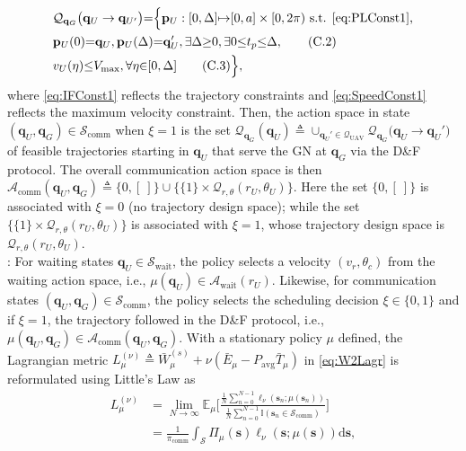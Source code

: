 \documentclass[10pt,twocolumn]{IEEEtran}
\begin{document}
\begin{align*}
	&\mathcal{Q}_{\mathbf{q}_{G}}\big({\mathbf{q}}_{U}\rightarrow{\mathbf{q}}_{U'}\big){=}\Big\{\mathbf{p}_{U}:[0,\Delta]{\mapsto}[0,a]\times[0,2\pi)\text{ s.t. \ref{eq:PLConst1},}\\
	&\mathbf{p}_{U}(0){=}{\mathbf{q}}_{U},\mathbf{p}_{U}(\Delta){=}{\mathbf {q}}_{U}',{\exists}\Delta{\geq}0,{\exists}0{\leq}t_p{\leq}\Delta,\label{eq:IFConst1}\tag{C.2}\\
	&v_{U}(\eta){\leq}V_{\mathrm{max}},{\forall}\eta{\in}[0,\Delta]\label{eq:SpeedConst1}\tag{C.3}\Big\},
\end{align*}
where \ref{eq:IFConst1} reflects the trajectory constraints and \ref{eq:SpeedConst1} reflects the maximum velocity constraint. Then, the action space in state $(\mathbf{q}_{U},\mathbf{q}_{G}){\in}\mathcal{S}_{\mathrm{comm}}$ when $\xi{=}1$ is the set $\mathcal{Q}_{\mathbf{q}_{G}}(\mathbf{q}_{U}){\triangleq}\cup_{\mathbf{q}_{U}'{\in}\mathcal{Q}_{\mathrm{UAV}}}\mathcal{Q}_{\mathbf{q}_{G}}\big(\mathbf{q}_{U}{\rightarrow}\mathbf{q}_{U}'\big)$ of feasible trajectories starting in $\mathbf{q}_{U}$ that serve the GN at $\mathbf{q}_{G}$ via the D\&F protocol. The overall communication action space is then $\mathcal{A}_{\mathrm{comm}}(\mathbf{q}_{U},\mathbf{q}_{G}){\triangleq}\{0,[\ ]\}{\cup}\{\{1\}{\times}\mathcal{Q}_{r,\theta}(r_{U},\theta_{U})\}$. Here the set $\{0, [\ ]\}$ is associated with $\xi{=}0$ (no trajectory design space); while the set $\{\{1\}{\times}\mathcal{Q}_{r,\theta}(r_{U},\theta_{U})\}$ is associated with $\xi{=}1$, whose trajectory design space is $\mathcal{Q}_{r,\theta}(r_{U},\theta_{U})$.\\
: For waiting states $\mathbf{q}_{U}{\in}\mathcal{S}_{\mathrm{wait}}$, the policy selects a velocity $(v_{r},\theta_{c})$ from the waiting action space, i.e., $\mu(\mathbf{q}_{U}){\in}\mathcal{A}_{\mathrm{wait}}(r_{U})$. Likewise, for communication states $(\mathbf{q}_{U},\mathbf{q}_{G}){\in}\mathcal{S}_{\mathrm{comm}}$, the policy selects the scheduling decision $\xi{\in}\{0,1\}$ and if $\xi{=}1$, the trajectory followed in the D\&F protocol, i.e., $\mu(\mathbf{q}_{U},\mathbf{q}_{G}){\in}\mathcal{A}_{\mathrm{comm}}(\mathbf{q}_{U},\mathbf{q}_{G})$. With a stationary policy $\mu$ defined, the Lagrangian metric $L_{\mu}^{(\nu)}{\triangleq}\bar{W}_{\mu}^{(s)}{+}\nu(\bar{E}_{\mu}{-}P_{\mathrm{avg}}\bar{T}_{\mu})$ in \eqref{eq:W2Lagr} is reformulated using Little's Law as
\begin{align}\label{eq:CostMetric}
    L_\mu^{(\nu)}
    &= \lim_{N \rightarrow \infty} \mathbb{E}_\mu \Bigg[ \frac{\frac{1}{N}\sum_{n=0}^{N-1}  \ell_\nu(\mathbf{s}_n; \mu(\mathbf{s}_n)) }{\frac{1}{N}\sum_{n = 0}^{N-1} \mathbb I(\mathbf{s}_n \in \mathcal{S}_{\mathrm{comm}})}  \Bigg]\nonumber\\
    &= \frac{1}{\pi_{\mathrm{comm}}}\int_{\mathcal{S}} \Pi_{\mu}(\mathbf{s})\ell_\nu(\mathbf{s}; \mu(\mathbf{s}))\mathrm{d}\mathbf{s},
\end{align}
\end{document}
